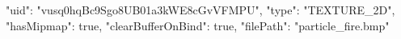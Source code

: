{
    "uid": "vusq0hqBc9Sgo8UB01a3kWE8cGvVFMPU",
    "type": "TEXTURE_2D",
    "hasMipmap": true,
    "clearBufferOnBind": true,
    "filePath": "particle_fire.bmp"
}
